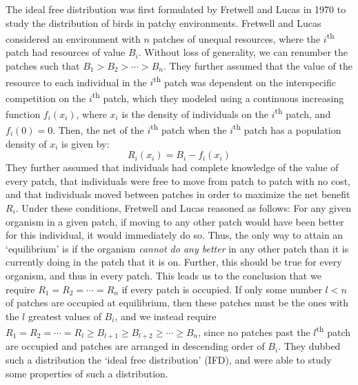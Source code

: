 The ideal free distribution was first formulated by Fretwell and Lucas in 1970 to study the distribution of birds in patchy environments. Fretwell and Lucas considered an environment with $n$ patches of unequal resources, where the $i$\textsuperscript{th} patch had resources of value $B_i$. Without loss of generality, we can renumber the patches such that $B_1 > B_2 > \cdots > B_n$. They further assumed that the value of the resource to each individual in the $i$\textsuperscript{th} patch was dependent on the interspecific competition on the $i$\textsuperscript{th} patch, which they modeled using a continuous increasing function $f_i(x_i)$, where $x_i$ is the density of individuals on the $i$\textsuperscript{th} patch, and $f_i(0) = 0$. Then, the net of the $i$\textsuperscript{th} patch when the $i$\textsuperscript{th} patch has a population density of $x_i$ is given by:
\begin{equation}
	\label{original_IFD}
	R_i(x_i) = B_i - f_i(x_i)
\end{equation}
They further assumed that individuals had complete knowledge of the value of every patch, that individuals were free to move from patch to patch with no cost, and that individuals moved between patches in order to maximize the net benefit $R_i$. Under these conditions, Fretwell and Lucas reasoned as follows: For any given organism in a given patch, if moving to any other patch would have been better for this individual, it would immediately do so. Thus, the only way to attain an `equilibrium' is if the organism \textit{cannot do any better} in any other patch than it is currently doing in the patch that it is on. Further, this should be true for every organism, and thus in every patch. This leads us to the conclusion that we require $R_1 = R_2 = \cdots = R_n$ if every patch is occupied. If only some number $l < n$ of patches are occupied at equilibrium, then these patches must be the ones with the $l$ greatest values of $B_i$, and we instead require $R_1 = R_2 = \cdots = R_l \geq B_{l+1} \geq B_{l+2} \geq \cdots \geq B_n$, since no patches past the $l$\textsuperscript{th} patch are occupied and patches are arranged in descending order of $B_i$. They dubbed such a distribution the `ideal free distribution' (IFD), and were able to study some properties of such a distribution.

